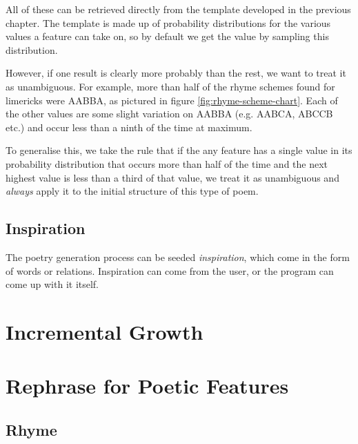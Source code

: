 All of these can be retrieved directly from the template developed in the previous chapter. The template is made up of probability distributions for the various values a feature can take on, so by default we get the value by sampling this distribution. 

However, if one result is clearly more probably than the rest, we want to treat it as unambiguous. For example, more than half of the rhyme schemes found for limericks were AABBA, as pictured in figure \ref{fig:rhyme-scheme-chart}. Each of the other values are some slight variation on AABBA (e.g. AABCA, ABCCB etc.) and occur less than a ninth of the time at maximum.

To generalise this, we take the rule that if the any feature has a single value in its probability distribution that occurs more than half of the time and the next highest value is less than a third of that value, we treat it as unambiguous and \textit{always} apply it to the initial structure of this type of poem.


\subsection{Inspiration}
The poetry generation process can be seeded \textit{inspiration}, which come in the form of words or relations. Inspiration can come from the user, or the program can come up with it itself.


\section{Incremental Growth}


\section{Rephrase for Poetic Features}

\subsection{Rhyme}


